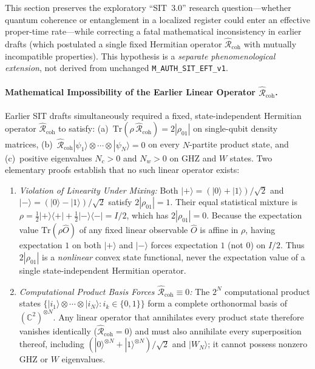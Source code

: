 This section preserves the exploratory ``SIT~3.0'' research question---whether quantum coherence or entanglement in a localized register could enter an effective proper-time rate---while correcting a fatal mathematical inconsistency in earlier drafts (which postulated a single fixed Hermitian operator $\hat{\mathcal{R}}_{\mathrm{coh}}$ with mutually incompatible properties). This hypothesis is a \emph{separate phenomenological extension}, not derived from unchanged \texttt{M\_AUTH\_SIT\_EFT\_v1}.

\paragraph{Mathematical Impossibility of the Earlier Linear Operator $\hat{\mathcal{R}}_{\mathrm{coh}}$.}
Earlier SIT drafts simultaneously required a fixed, state-independent Hermitian operator $\hat{\mathcal{R}}_{\mathrm{coh}}$ to satisfy: (a)~$\mathrm{Tr}(\rho\,\hat{\mathcal{R}}_{\mathrm{coh}}) = 2|\rho_{01}|$ on single-qubit density matrices, (b)~$\hat{\mathcal{R}}_{\mathrm{coh}}|\psi_1\rangle\otimes\cdots\otimes|\psi_N\rangle = 0$ on every $N$-partite product state, and (c)~positive eigenvalues $N_c > 0$ and $N_w > 0$ on GHZ and $W$ states. Two elementary proofs establish that no such linear operator exists:
\begin{enumerate}[leftmargin=2em]
  \item \emph{Violation of Linearity Under Mixing:} Both $|+\rangle = (|0\rangle + |1\rangle)/\sqrt{2}$ and $|-\rangle = (|0\rangle - |1\rangle)/\sqrt{2}$ satisfy $2|\rho_{01}| = 1$. Their equal statistical mixture is $\rho = \frac{1}{2}|+\rangle\langle +| + \frac{1}{2}|-\rangle\langle -| = I/2$, which has $2|\rho_{01}| = 0$. Because the expectation value $\mathrm{Tr}(\rho\hat{O})$ of any fixed linear observable $\hat{O}$ is affine in $\rho$, having expectation $1$ on both $|+\rangle$ and $|-\rangle$ forces expectation $1$ (not $0$) on $I/2$. Thus $2|\rho_{01}|$ is a \emph{nonlinear} convex state functional, never the expectation value of a single state-independent Hermitian operator.
  \item \emph{Computational Product Basis Forces $\hat{\mathcal{R}}_{\mathrm{coh}} \equiv 0$:} The $2^N$ computational product states $\{|i_1\rangle\otimes\cdots\otimes|i_N\rangle : i_k \in \{0,1\}\}$ form a complete orthonormal basis of $(\mathbb{C}^2)^{\otimes N}$. Any linear operator that annihilates every product state therefore vanishes identically ($\hat{\mathcal{R}}_{\mathrm{coh}} = 0$) and must also annihilate every superposition thereof, including $(|0\rangle^{\otimes N} + |1\rangle^{\otimes N})/\sqrt{2}$ and $|W_N\rangle$; it cannot possess nonzero GHZ or $W$ eigenvalues.
\end{enumerate}

